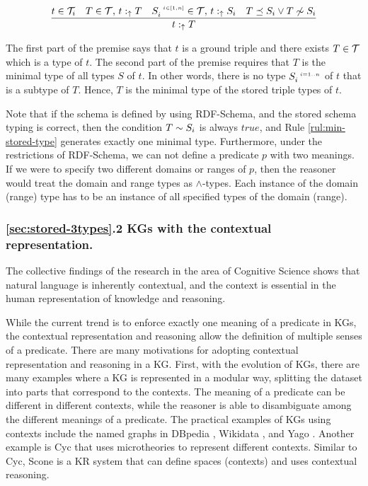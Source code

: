 \documentclass[runningheads]{llncs}
\newcommand{\s}{\scriptscriptstyle\ \,}
\newcommand{\uarr}{\uparrow}
\newcommand{\T}{{\cal T}}
\begin{document}
\begin{equation}
\label{rul:min-stored-type}
\dfrac{t\in\T_i\quad T\in\T,\, t:_\uarr\/T\quad\/S_i^{\s\/i\in[1,n]}\in\T,\, t:_\uarr\/S_i\quad T\preceq\/S_i\lor\/T\not\sim\/S_i}
      {t:_{\uarr}\/T}
\end{equation}

The first part of the premise says that $t$ is a ground triple and there
exists $T\in\T$ which is a type of $t$. The second part of the premise
requires that $T$ is the minimal type of all types $S$ of $t$. In
other words, there is no type $S_i^{\s\/i=1..n}$ of $t$ that is a
subtype of $T$. Hence, $T$ is the minimal type of the stored triple
types of $t$.

Note that if the schema is defined by using RDF-Schema, and the stored
schema typing is correct, then the condition $T\sim\/S_i$ is always
$true$, and Rule \ref{rul:min-stored-type} generates exactly one
minimal type. Furthermore, under the restrictions of RDF-Schema, we can
not define a predicate $p$ with two meanings. If we were to specify two
different domains or ranges of $p$, then the reasoner would treat the
domain and range types as $\land$-types. Each instance of the domain
(range) type has to be an instance of all specified types of the
domain (range).

% 



\subsubsection{\ref{sec:stored-3types}.2 KGs with the contextual representation.}

The collective findings of the research in the area of Cognitive
Science \cite{Hollister2017} shows that natural language is inherently
contextual, and the context is essential in the human representation
of knowledge and reasoning. 

While the current trend is to enforce exactly one meaning of a
predicate in KGs, the contextual representation and reasoning allow
the definition of multiple senses of a predicate. There are many
motivations for adopting contextual representation and reasoning in a
KG. First, with the evolution of KGs, there are many examples where a
KG is represented in a modular way, splitting the dataset into parts
that correspond to the contexts. The meaning of a predicate can be
different in different contexts, while the reasoner is able to
disambiguate among the different meanings of a predicate.
The practical examples of KGs using contexts include the named graphs
in DBpedia \cite{Auer2007}, Wikidata \cite{vrandecic2014}, and Yago
\cite{Hoffart2013}. Another example is Cyc \cite{cyc} that uses
microtheories to represent different contexts. Similar to Cyc, Scone
\cite{Fahlman2011} is a KR system that can define spaces (contexts)
and uses contextual reasoning.
\end{document}
